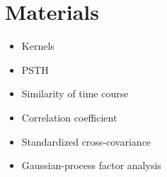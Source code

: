 \section{Materials}

\begin{itemize}
	\item Kernels
	\item PSTH 
	\item Similarity of time course
	\item Correlation coefficient
	\item Standardized cross-covariance
	\item Gaussian-process factor analysis
\end{itemize}

